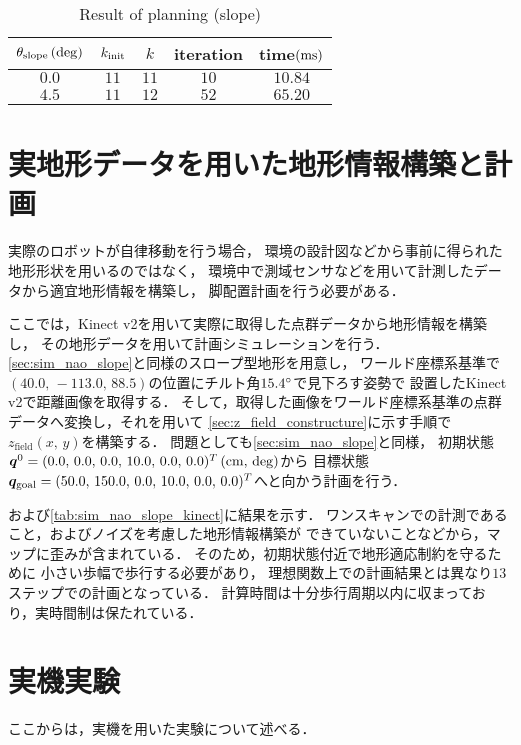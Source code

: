 \documentclass[autodetect-engine,dvipdfmx-if-dvi,ja=standard,a4j,jbase=11pt,magstyle=nomag*]{bxjsreport}
\begin{document}
\begin{table}[t]%
    \caption{Result of planning (slope)}%
    \label{tab:sim_nao_slope}%
    \centering%
    \begin{tabular}{ccccc}%
        \toprule%
        $\theta_{\mathrm{slope}}\,(\mathrm{deg})$ &   $k_{\mathrm{init}}$ &   $k$     &   iteration   &   time$(\si{\milli\second})$ \\%
        \midrule%
        $0.0$                       &   $11$        &   $11$    &   $10$        &   $10.84$ \\%
        $4.5$                       &   $11$        &   $12$    &   $52$        &   $65.20$ \\%
        \bottomrule%
    \end{tabular}
\end{table}


\section{実地形データを用いた地形情報構築と計画}
実際のロボットが自律移動を行う場合，
環境の設計図などから事前に得られた地形形状を用いるのではなく，
環境中で測域センサなどを用いて計測したデータから適宜地形情報を構築し，
脚配置計画を行う必要がある．

ここでは，Kinect v2を用いて実際に取得した点群データから地形情報を構築し，
その地形データを用いて計画シミュレーションを行う．
\cref{sec:sim_nao_slope}と同様のスロープ型地形を用意し，
ワールド座標系基準で$(40.0 ,\, -113.0 ,\, 88.5)$の位置にチルト角$15.4\degree$で見下ろす姿勢で
設置したKinect v2で距離画像を取得する．
そして，取得した画像をワールド座標系基準の点群データへ変換し，それを用いて
\cref{sec:z_field_constructure}に示す手順で$z_\mathrm{field}(x ,\, y)$を構築する．
問題としても\cref{sec:sim_nao_slope}と同様，
初期状態$\bm{q}^0 = ( 0.0 ,\, 0.0 ,\, 0.0 ,\, 10.0 ,\, 0.0 ,\, 0.0 )^T\,(\si{\centi\meter} ,\, \mathrm{deg})$から
目標状態$\bm{q}_{\mathrm{goal}} = ( 50.0 ,\, 150.0 ,\, 0.0 ,\, 10.0 ,\, 0.0 ,\, 0.0 )^T$へと向かう計画を行う．



および\cref{tab:sim_nao_slope_kinect}に結果を示す．
ワンスキャンでの計測であること，およびノイズを考慮した地形情報構築が
できていないことなどから，マップに歪みが含まれている．
そのため，初期状態付近で地形適応制約を守るために
小さい歩幅で歩行する必要があり，
理想関数上での計画結果とは異なり$13$ステップでの計画となっている．
計算時間は十分歩行周期以内に収まっており，実時間制は保たれている．


\section{実機実験}
ここからは，実機を用いた実験について述べる．
\end{document}
